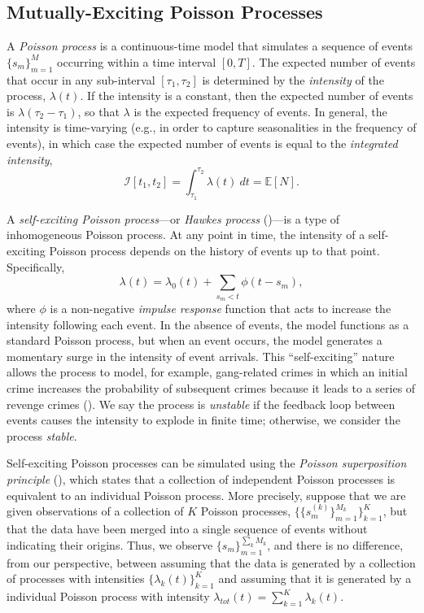 	\subsection{Mutually-Exciting Poisson Processes}
		A \textit{Poisson process} is a continuous-time model that simulates a sequence of events $\{s_m\}_{m=1}^M$ occurring within a time interval $\left[0, T\right]$. The expected number of events that occur in any sub-interval $[\tau_1, \tau_2]$ is determined by the \textit{intensity} of the process, $\lambda(t)$. If the intensity is a constant, then the expected number of events is $\lambda (\tau_2 - \tau_1)$, so that $\lambda$ is the expected frequency of events. In general, the intensity is time-varying (e.g., in order to capture seasonalities in the frequency of events), in which case the expected number of events is equal to the \textit{integrated intensity},
		\begin{equation}
			\mathcal{I}\left[t_1, t_2\right] = \int_{\tau_1}^{\tau_2} \lambda(t) \ dt = \mathbb{E} \left[ N \right].
		\end{equation}

		A \textit{self-exciting Poisson process}---or \textit{Hawkes process} (\cite{Hawkes1971})---is a type of inhomogeneous Poisson process. At any point in time, the intensity of a self-exciting Poisson process depends on the history of events up to that point. Specifically,
		\begin{equation}
			\lambda(t) = \lambda_0(t) + \sum_{s_m < t} \phi(t - s_m),
		\end{equation}
		where $\phi$ is a non-negative \textit{impulse response} function that acts to increase the intensity following each event. In the absence of events, the model functions as a standard Poisson process, but when an event occurs, the model generates a momentary surge in the intensity of event arrivals. This ``self-exciting'' nature allows the process to model, for example, gang-related crimes in which an initial crime increases the probability of subsequent crimes because it leads to a series of revenge crimes (\cite{Cho2013}). We say the process is \textit{unstable} if the feedback loop between events causes the intensity to explode in finite time; otherwise, we consider the process \textit{stable}.

		Self-exciting Poisson processes can be simulated using the \textit{Poisson superposition principle} (\cite{Kingman1993}), which states that a collection of independent Poisson processes is equivalent to an individual Poisson process. More precisely, suppose that we are given observations of a collection of $K$ Poisson processes, $\{ \{ s_m^{(k)} \}_{m=1}^{M_k} \}_{k=1}^K$, but that the data have been merged into a single sequence of events without indicating their origins. Thus, we observe $\{ s_m \}_{m=1}^{\sum_k M_k}$, and there is no difference, from our perspective, between assuming that the data is generated by a collection of processes with intensities $\{\lambda_k(t)\}_{k=1}^K$ and assuming that it is generated by a individual Poisson process with intensity $\lambda_{tot}(t) = \sum_{k=1}^K \lambda_k(t)$.

